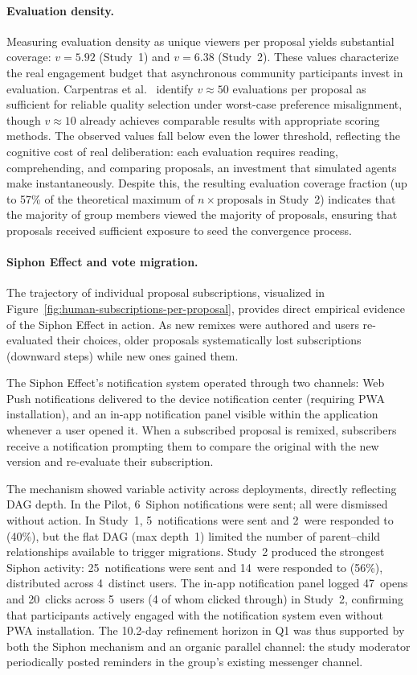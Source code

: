 \documentclass[a4paper, 12pt, twoside]{iviathesis}
\begin{document}
\paragraph{Evaluation density.}
Measuring evaluation density as unique viewers per proposal yields substantial coverage: $v = 5.92$ (Study~1) and $v = 6.38$ (Study~2). These values characterize the real engagement budget that asynchronous community participants invest in evaluation. Carpentras et al.\ \cite{carpentras_wisdom_2025} identify $v \approx 50$ evaluations per proposal as sufficient for reliable quality selection under worst-case preference misalignment, though $v \approx 10$ already achieves comparable results with appropriate scoring methods. The observed values fall below even the lower threshold, reflecting the cognitive cost of real deliberation: each evaluation requires reading, comprehending, and comparing proposals, an investment that simulated agents make instantaneously. Despite this, the resulting evaluation coverage fraction (up to 57\% of the theoretical maximum of $n \times \text{proposals}$ in Study~2) indicates that the majority of group members viewed the majority of proposals, ensuring that proposals received sufficient exposure to seed the convergence process.

\paragraph{Siphon Effect and vote migration.}
The trajectory of individual proposal subscriptions, visualized in Figure~\ref{fig:human-subscriptions-per-proposal}, provides direct empirical evidence of the Siphon Effect in action. As new remixes were authored and users re-evaluated their choices, older proposals systematically lost subscriptions (downward steps) while new ones gained them.

The Siphon Effect's notification system operated through two channels: Web Push notifications delivered to the device notification center (requiring PWA installation), and an in-app notification panel visible within the application whenever a user opened it. When a subscribed proposal is remixed, subscribers receive a notification prompting them to compare the original with the new version and re-evaluate their subscription.

The mechanism showed variable activity across deployments, directly reflecting DAG depth. In the Pilot, 6~Siphon notifications were sent; all were dismissed without action. In Study~1, 5~notifications were sent and 2~were responded to (40\%), but the flat DAG (max depth~1) limited the number of parent--child relationships available to trigger migrations. Study~2 produced the strongest Siphon activity: 25~notifications were sent and 14~were responded to (56\%), distributed across 4~distinct users. The in-app notification panel logged 47~opens and 20~clicks across 5~users (4 of whom clicked through) in Study~2, confirming that participants actively engaged with the notification system even without PWA installation. The 10.2-day refinement horizon in Q1 was thus supported by both the Siphon mechanism and an organic parallel channel: the study moderator periodically posted reminders in the group's existing messenger channel.
\end{document}
